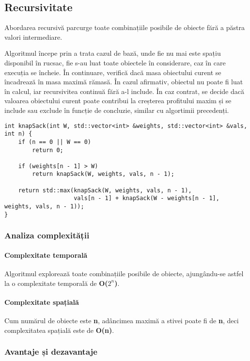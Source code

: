 \documentclass[runningheads]{llncs}
\begin{document}
\subsection{Recursivitate}

Abordarea recursivă parcurge toate combinațiile posibile de obiecte fără a păstra valori intermediare.

Algoritmul începe prin a trata cazul de bază, unde fie nu mai este spațiu disponibil
în rucsac, fie s-au luat toate obiectele în considerare, caz în care execuția se încheie.
În continuare, verifică dacă masa obiectului curent se încadrează în masa maximă rămasă.
În cazul afirmativ, obiectul nu poate fi luat în calcul, iar recursivitea continuă fără
a-l include. În caz contrat, se decide dacă valoarea obiectului curent poate contribui la creșterea
profitului maxim și se include sau exclude în funcție de concluzie, similar cu algortimii precedenți.

\begin{lstlisting}
int knapSack(int W, std::vector<int> &weights, std::vector<int> &vals, int n) {
	if (n == 0 || W == 0)
		return 0;

	if (weights[n - 1] > W)
		return knapSack(W, weights, vals, n - 1);

	return std::max(knapSack(W, weights, vals, n - 1),
					vals[n - 1] + knapSack(W - weights[n - 1], weights, vals, n - 1));
}
\end{lstlisting}

\subsubsection{Analiza complexității}

\paragraph{Complexitate temporală} Algoritmul explorează toate combinațiile posibile de obiecte,
ajungându-se astfel la o complexitate temporală de \textbf{O($2^n$)}.

\paragraph{Complexitate spațială} Cum numărul de obiecte este \textbf{n}, adâncimea maximă
a stivei poate fi de \textbf{n}, deci complexitatea spațială este de \textbf{O(n)}.

\subsubsection{Avantaje și dezavantaje}
\end{document}
